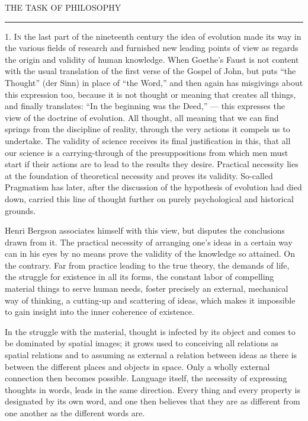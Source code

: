 \documentclass[12pt,a4paper,openany]{book}
\newcommand{\opage}[1]{\marginnote{\footnotesize\textit{[#1]}}}
\newcommand{\chapterhead}[1]{\clearpage\phantomsection\addcontentsline{toc}{chapter}{#1}\vspace*{3cm}\begin{center}{\large #1}\\[6pt]\rule{1.2cm}{0.4pt}\end{center}\medskip}
\newcommand{\initial}[2]{{\Large #1}\textsc{#2}}
\begin{document}
\mainmatter
\pagestyle{fancy}
\opage{1}\chapterhead{THE TASK OF PHILOSOPHY}

1. \initial{I}{n} the last part of the nineteenth century the idea of evolution made its way in the various fields of research and furnished new leading points of view as regards the origin and validity of human knowledge. When Goethe's Faust is not content with the usual translation of the first verse of the Gospel of John, but puts ``the Thought'' (der Sinn) in place of ``the Word,'' and then again has misgivings about this expression too, because it is not thought or meaning that creates all things, and finally translates: ``In the beginning was the Deed,'' --- this expresses the view of the doctrine of evolution. All thought, all meaning that we can find springs from the discipline of reality, through the very actions it compels us to undertake. The validity of science receives its final justification in this, that all our science is a carrying-through of the presuppositions from which men must start if their actions are to lead to the results they desire. Practical necessity lies at the foundation of theoretical necessity and proves its validity. So-called Pragmatism has later, after the discussion of the hypothesis of evolution had died down, carried this line of thought further on purely psychological and historical grounds.

Henri Bergson associates himself with this view, but disputes the conclusions drawn from it. The practical necessity of arranging one's ideas in a certain way can in his eyes by no means prove the validity of
\opage{2}the knowledge so attained. On the contrary. Far from practice leading to the true theory, the demands of life, the struggle for existence in all its forms, the constant labor of compelling material things to serve human needs, foster precisely an external, mechanical way of thinking, a cutting-up and scattering of ideas, which makes it impossible to gain insight into the inner coherence of existence.

In the struggle with the material, thought is infected by its object and comes to be dominated by spatial images; it grows used to conceiving all relations as spatial relations and to assuming as external a relation between ideas as there is between the different places and objects in space. Only a wholly external connection then becomes possible. Language itself, the necessity of expressing thoughts in words, leads in the same direction. Every thing and every property is designated by its own word, and one then believes that they are as different from one another as the different words are.
\end{document}
